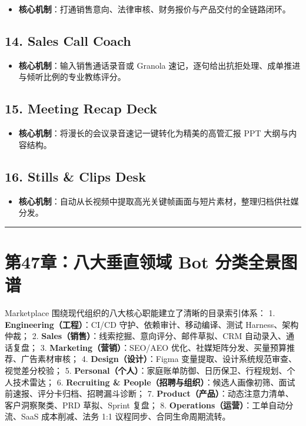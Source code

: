 \documentclass[10.5pt,a4paper,oneside]{report}
\providecommand{\tightlist}{\setlength{\itemsep}{0pt}\setlength{\parskip}{0pt}}
\begin{document}
\begin{itemize}
\tightlist
\item
  \textbf{核心机制}：打通销售意向、法律审核、财务报价与产品交付的全链路闭环。
\end{itemize}

\subsection{14. Sales Call Coach}\label{sales-call-coach}

\begin{itemize}
\tightlist
\item
  \textbf{核心机制}：输入销售通话录音或 Granola
  速记，逐句给出抗拒处理、成单推进与倾听比例的专业教练评分。
\end{itemize}

\subsection{15. Meeting Recap Deck}\label{meeting-recap-deck}

\begin{itemize}
\tightlist
\item
  \textbf{核心机制}：将漫长的会议录音速记一键转化为精美的高管汇报 PPT
  大纲与内容结构。
\end{itemize}

\subsection{16. Stills \& Clips Desk}\label{stills-clips-desk}

\begin{itemize}
\tightlist
\item
  \textbf{核心机制}：自动从长视频中提取高光关键帧画面与短片素材，整理归档供社媒分发。
\end{itemize}

\begin{center}\rule{0.5\linewidth}{0.5pt}\end{center}

\section{第47章：八大垂直领域 Bot
分类全景图谱}\label{ux7b2c47ux7ae0ux516bux5927ux5782ux76f4ux9886ux57df-bot-ux5206ux7c7bux5168ux666fux56feux8c31}

Marketplace 围绕现代组织的八大核心职能建立了清晰的目录索引体系： 1.
\textbf{Engineering（工程）}：CI/CD 守护、依赖审计、移动编译、测试
Harness、架构仲裁； 2.
\textbf{Sales（销售）}：线索挖掘、意向评分、邮件草拟、CRM
自动录入、通话复盘； 3. \textbf{Marketing（营销）}：SEO/AEO
优化、社媒矩阵分发、买量预算推荐、广告素材审核； 4.
\textbf{Design（设计）}：Figma
变量提取、设计系统规范审查、视觉差分校验； 5.
\textbf{Personal（个人）}：家庭账单防御、日历保卫、行程规划、个人技术雷达；
6. \textbf{Recruiting \&
People（招聘与组织）}：候选人画像初筛、面试前速报、评分卡归档、招聘漏斗诊断；
7. \textbf{Product（产品）}：动态注意力清单、客户洞察聚类、PRD
草拟、Sprint 复盘； 8. \textbf{Operations（运营）}：工单自动分流、SaaS
成本削减、法务 1:1 议程同步、合同生命周期流转。
\end{document}
